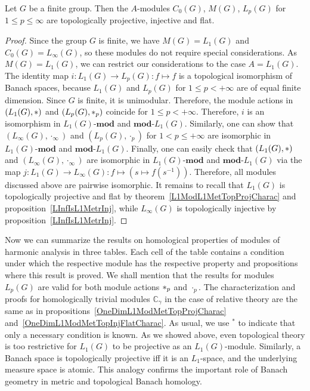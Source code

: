 \begin{proposition}\label{StdModFinGrL1MGTopInjProjFlatCharac} Let $G$ be a
finite group. Then the $A$-modules $C_0(G)$, $M(G)$, $L_p(G)$ 
for $1\leq p\leq \infty$ are topologically projective, injective and flat.
\end{proposition} 
\begin{proof}
Since the group $G$ is finite, we have $M(G)=L_1(G)$ and $C_0(G)=L_\infty(G)$, 
so these modules do not require special considerations. As $M(G)=L_1(G)$, 
we can restrict our considerations to the case $A=L_1(G)$. The identity map
$i:L_1(G)\to L_p(G):f\mapsto f$ is a topological isomorphism of Banach spaces,
because $L_1(G)$ and $L_p(G)$ for $1\leq p<+\infty$ are of equal finite
dimension. Since $G$ is finite, it is unimodular. Therefore, the module actions
in $(L_1(G),\ast)$ and $(L_p(G),\ast_p)$ coincide for $1\leq p<+\infty$.
Therefore, $i$ is an isomorphism in $L_1(G)\text{-}\mathbf{mod}$ and $\mathbf{mod}\text{-}L_1(G)$.
Similarly, one can show that $(L_\infty(G),\cdot_\infty)$ and $(L_p(G),\cdot_p)$
for $1<p\leq+\infty$ are isomorphic in $L_1(G)\text{-}\mathbf{mod}$ and
$\mathbf{mod}\text{-}L_1(G)$. Finally, one can easily check that $(L_1(G),\ast)$ and
$(L_\infty(G),\cdot_\infty)$ are isomorphic in $L_1(G)\text{-}\mathbf{mod}$ and
$\mathbf{mod}\text{-}L_1(G)$ via the 
map $j:L_1(G)\to L_\infty(G):f\mapsto(s\mapsto f(s^{-1}))$. Therefore, all 
modules discussed above are pairwise isomorphic. It remains to
recall that $L_1(G)$ is topologically projective and flat by
theorem~\ref{L1ModL1MetTopProjCharac} and proposition~\ref{LInfIsL1MetrInj},
while $L_\infty(G)$ is topologically injective by
proposition~\ref{LInfIsL1MetrInj}.
\end{proof}

Now we can summarize the results on homological properties of modules of harmonic
analysis in three tables. Each cell of the table contains a condition under
which the respective module has the respective property and propositions where this
result is proved. We shall mention that the results for modules $L_p(G)$ are valid for both
module actions $\ast_p$ and $\cdot_p$. The characterization and proofs for
homologically trivial modules $\mathbb{C}_\gamma$ in the case of relative theory are
the same as in
propositions~\ref{OneDimL1ModMetTopProjCharac}
and~\ref{OneDimL1ModMetTopInjFlatCharac}. As usual, we use ${}^{*}$ to
indicate that only a necessary condition is known. As we showed above, even
topological theory is too restrictive for $L_1(G)$ to be projective as an
$L_1(G)$-module. Similarly, a Banach space is topologically projective iff it is
an $L_1$-space, and the underlying measure space is atomic. This analogy
confirms the important role of Banach geometry in metric and topological Banach
homology.

